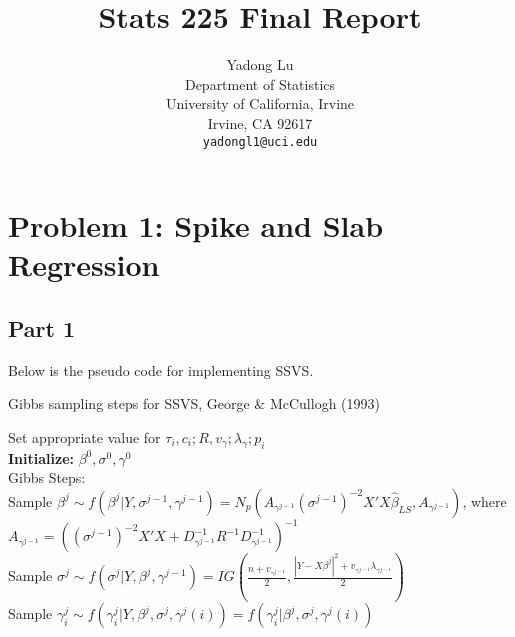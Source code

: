 \documentclass{article}
\title{Stats 225 Final Report}
\author{
  Yadong Lu\\
  Department of Statistics\\
  University of California, Irvine\\
  Irvine, CA 92617 \\
  \texttt{yadongl1@uci.edu} \\
}
\newcommand*\DNA{\textsc{dna}}
\newcommand*\Let[6]{\State #1 $\gets$ #2}
\begin{document}

\maketitle
\section*{Problem 1: Spike and Slab Regression}


\subsection*{Part 1}
Below is the pseudo code for implementing SSVS.

\begin{algorithm}[H]
  \caption{Gibbs sampling steps for SSVS, George \& McCullogh (1993)
    \label{alg:packed-dna-hamming}}  
  \begin{algorithmic}[]  
    \Statex 
    Set appropriate value for $\tau_{i}, c_{i}; R, v_{\gamma}; \lambda_{\gamma}; p_{i}$ \\
    \textbf{Initialize:} $\beta^{0}, \sigma^{0}, \gamma^{0}$ \\
    Gibbs Steps: 
    \\
     \hspace{0.1in} Sample $\beta^{j} \sim f(\beta^{j}| Y, \sigma^{j-1}, \gamma^{j-1})= N_{p}(A_{\gamma^{j-1}} (\sigma^{j-1})^{-2} X'X \hat{\beta}_{LS}, A_{\gamma^{j-1}} )$, where $A_{\gamma^{j-1}} = ((\sigma^{j-1})^{-2}X'X + D^{-1}_{\gamma^{j-1}} R^{-1}D^{-1}_{\gamma^{j-1}}  )^{-1}$ \\
     \hspace{0.1in} Sample $\sigma^{j} \sim f(\sigma^{j}|Y, \beta^{j}, \gamma^{j-1}) = IG(\frac{n+v_{\gamma^{j-1}}}{2}, \frac{|Y-X\beta^{j}|^{2}+v_{\gamma^{j-1}}\lambda_{\gamma^{j-1}}  }{2})  $ \\
     \hspace{0.1in} Sample $\gamma^{j}_{i} \sim f( \gamma^{j}_{i} | Y, \beta^{j}, \sigma^{j}, \gamma^{j}(i) ) = f(\gamma^{j}_{i}|\beta^{j}, \sigma^{j}, \gamma^{j}(i)) $
    \EndFor
  \end{algorithmic}  
\end{algorithm}
\end{document}
